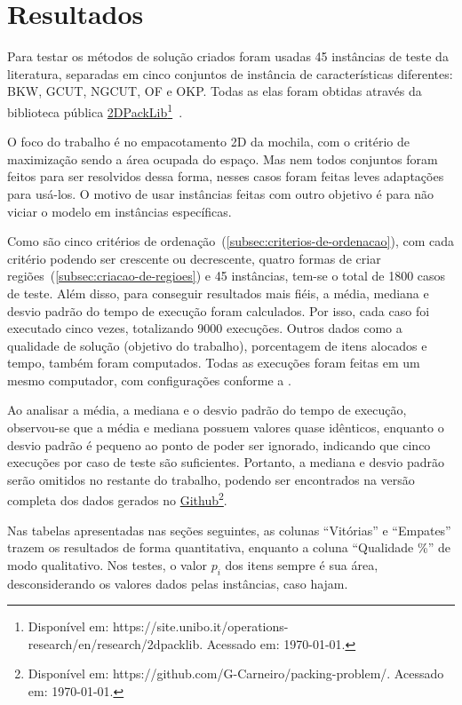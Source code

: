 \section{Resultados}\label{sec:resultados}

Para testar os métodos de solução criados foram usadas 45 instâncias de teste da literatura,
separadas em cinco conjuntos de instância de características diferentes:
BKW, GCUT, NGCUT, OF e OKP\@.
Todas as elas foram obtidas através da biblioteca pública
\href{https://site.unibo.it/operations-research/en/research/2dpacklib}{2DPackLib}\footnote{
    Disponível em: https://site.unibo.it/operations-research/en/research/2dpacklib.
    Acessado em: \today.}~\cite{2DPackLib}.

O foco do trabalho é no empacotamento 2D da mochila, com o critério de maximização sendo a
área ocupada do espaço.
Mas nem todos conjuntos foram feitos para ser resolvidos dessa forma, nesses casos foram
feitas leves adaptações para usá-los.
O motivo de usar instâncias feitas com outro objetivo é para não viciar o modelo em instâncias
específicas.

Como são cinco critérios de ordenação~(\cref{subsec:criterios-de-ordenacao}), com cada critério
podendo ser crescente ou decrescente, quatro formas de criar regiões~(\cref{subsec:criacao-de-regioes})
e 45 instâncias, tem-se o total de 1800 casos de teste.
Além disso, para conseguir resultados mais fiéis, a média, mediana e desvio padrão do tempo de
execução foram calculados.
Por isso, cada caso foi executado cinco vezes, totalizando 9000 execuções.
Outros dados como a qualidade de solução (objetivo do trabalho), porcentagem de itens alocados
e tempo, também foram computados.
Todas as execuções foram feitas em um mesmo computador, com configurações conforme a
.



Ao analisar a média, a mediana e o desvio padrão do tempo de execução, observou-se que a média
e mediana possuem valores quase idênticos, enquanto o desvio padrão é pequeno ao ponto de poder
ser ignorado, indicando que cinco execuções por caso de teste são suficientes.
Portanto, a mediana e desvio padrão serão omitidos no restante do trabalho, podendo ser encontrados
na versão completa dos dados gerados no \href{https://github.com/G-Carneiro/packing-problem/}{
    Github}\footnote{Disponível em: https://github.com/G-Carneiro/packing-problem/. Acessado em: \today.}.

Nas tabelas apresentadas nas seções seguintes, as colunas “Vitórias” e “Empates” trazem os
resultados de forma quantitativa, enquanto a coluna “Qualidade \%” de modo qualitativo.
Nos testes, o valor $p_i$ dos itens sempre é sua área, desconsiderando os valores dados pelas
instâncias, caso hajam.

